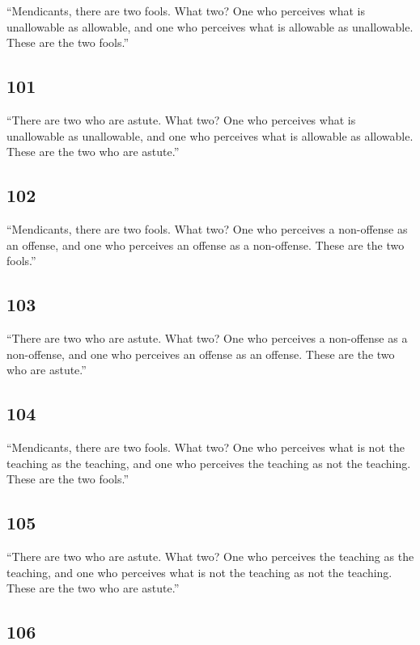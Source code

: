 \documentclass[12pt,openany]{book}%
\begin{document}
“Mendicants, there are two fools. What two? One who perceives what is unallowable as allowable, and one who perceives what is allowable as unallowable. These are the two fools.” 

\subsection*{101 }

“There are two who are astute. What two? One who perceives what is unallowable as unallowable, and one who perceives what is allowable as allowable. These are the two who are astute.” 

\subsection*{102 }

“Mendicants, there are two fools. What two? One who perceives a non-offense as an offense, and one who perceives an offense as a non-offense. These are the two fools.” 

\subsection*{103 }

“There are two who are astute. What two? One who perceives a non-offense as a non-offense, and one who perceives an offense as an offense. These are the two who are astute.” 

\subsection*{104 }

“Mendicants, there are two fools. What two? One who perceives what is not the teaching as the teaching, and one who perceives the teaching as not the teaching. These are the two fools.” 

\subsection*{105 }

“There are two who are astute. What two? One who perceives the teaching as the teaching, and one who perceives what is not the teaching as not the teaching. These are the two who are astute.” 

\subsection*{106 }
\end{document}
